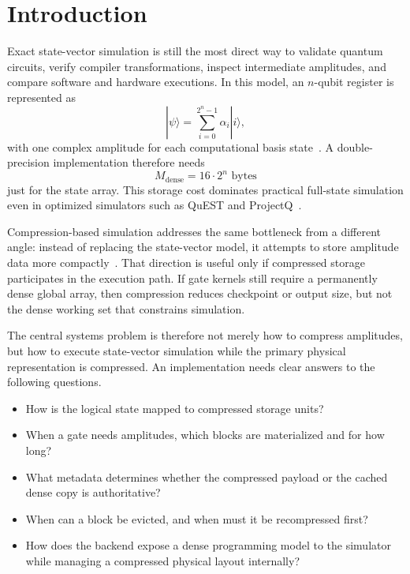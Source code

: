 \documentclass[runningheads]{llncs}
\begin{document}
\section{Introduction}

Exact state-vector simulation is still the most direct way to validate quantum circuits, verify compiler transformations, inspect intermediate amplitudes, and compare software and hardware executions. In this model, an $n$-qubit register is represented as
\begin{equation}
  |\psi\rangle = \sum_{i=0}^{2^n-1} \alpha_i |i\rangle,
\end{equation}
with one complex amplitude for each computational basis state~\cite{Nielsen2010}. A double-precision implementation therefore needs
\begin{equation}
  M_{\mathrm{dense}} = 16 \cdot 2^n \text{ bytes}
\end{equation}
just for the state array. This storage cost dominates practical full-state simulation even in optimized simulators such as QuEST and ProjectQ~\cite{Jones2019,Steiger2018,Haner2017,diaz_mdpi_mmss}.

Compression-based simulation addresses the same bottleneck from a different angle: instead of replacing the state-vector model, it attempts to store amplitude data more compactly~\cite{wu2019full,wu2018amplitude,Zhang2025BMQSim}. That direction is useful only if compressed storage participates in the execution path. If gate kernels still require a permanently dense global array, then compression reduces checkpoint or output size, but not the dense working set that constrains simulation.

The central systems problem is therefore not merely how to compress amplitudes, but how to execute state-vector simulation while the primary physical representation is compressed. An implementation needs clear answers to the following questions.
\begin{itemize}[leftmargin=1.4em]
  \item How is the logical state mapped to compressed storage units?
  \item When a gate needs amplitudes, which blocks are materialized and for how long?
  \item What metadata determines whether the compressed payload or the cached dense copy is authoritative?
  \item When can a block be evicted, and when must it be recompressed first?
  \item How does the backend expose a dense programming model to the simulator while managing a compressed physical layout internally?
\end{itemize}
\end{document}
